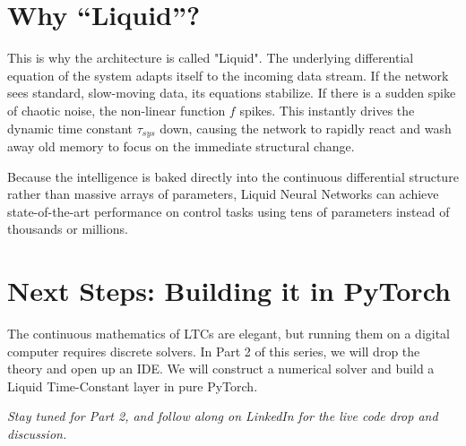 \documentclass[12pt]{article}
\begin{document}
\section*{Why ``Liquid''?}
This is why the architecture is called "Liquid". The underlying differential equation of the system adapts itself to the incoming data stream. If the network sees standard, slow-moving data, its equations stabilize. If there is a sudden spike of chaotic noise, the non-linear function $f$ spikes. This instantly drives the dynamic time constant $\tau_{sys}$ down, causing the network to rapidly react and wash away old memory to focus on the immediate structural change.

Because the intelligence is baked directly into the continuous differential structure rather than massive arrays of parameters, Liquid Neural Networks can achieve state-of-the-art performance on control tasks using tens of parameters instead of thousands or millions.

\section*{Next Steps: Building it in PyTorch}
The continuous mathematics of LTCs are elegant, but running them on a digital computer requires discrete solvers. In Part 2 of this series, we will drop the theory and open up an IDE. We will construct a numerical solver and build a Liquid Time-Constant layer in pure PyTorch.

\vspace{1em}
\noindent \textit{Stay tuned for Part 2, and follow along on LinkedIn for the live code drop and discussion.}
\end{document}
